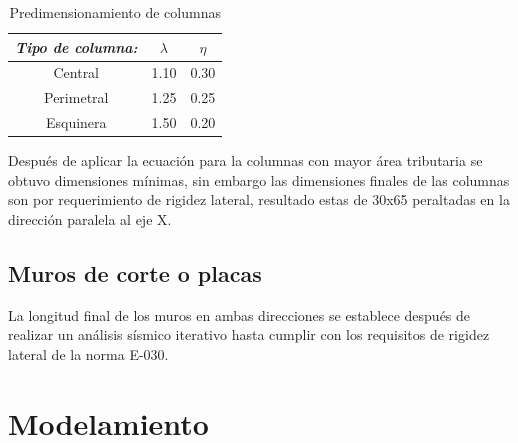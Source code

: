 \documentclass[12pt]{article}
\begin{document}
\begin{table}[htbp]
  \centering
  \caption{Predimensionamiento de columnas}
    \begin{tabular}{|c|c|c|}
    \hline
    \rowcolor[rgb]{ .906,  .902,  .902} \textit{\textbf{Tipo de columna:}} & \multicolumn{1}{p{10.665em}|}{\centering\textbf{$\lambda$}} & \multicolumn{1}{p{11.945em}|}{\centering\textbf{$\eta$}} \\
    \hline
    \rowcolor[rgb]{ .906,  .902,  .902} Central & \cellcolor[rgb]{ 1,  1,  1}1.10 & \cellcolor[rgb]{ 1,  1,  1}0.30 \\
    \hline
    \rowcolor[rgb]{ .906,  .902,  .902} Perimetral & \cellcolor[rgb]{ 1,  1,  1}1.25 & \cellcolor[rgb]{ 1,  1,  1}0.25 \\
    \hline
    \rowcolor[rgb]{ .906,  .902,  .902} Esquinera & \cellcolor[rgb]{ 1,  1,  1}1.50 & \cellcolor[rgb]{ 1,  1,  1}0.20 \\
    \hline
    \end{tabular}%
  \label{tab:addlabel}%
\end{table}%

Después de aplicar la ecuación  para la columnas con mayor área tributaria se obtuvo dimensiones mínimas, sin embargo las dimensiones finales de las columnas son por requerimiento de rigidez lateral, resultado estas de 30x65 peraltadas en la dirección paralela al eje X.


\subsection{Muros de corte o placas}

La longitud final de los muros en ambas direcciones se establece después de realizar un análisis sísmico iterativo hasta cumplir con los requisitos de rigidez lateral de la norma E-030.

\section{Modelamiento}
\end{document}
